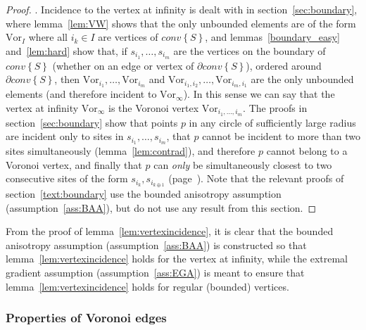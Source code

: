 \documentclass[11pt]{article}
\newcommand{\Sites}{S}
\newcommand{\Vor}{\text{Vor}}
\newcommand{\CHS}{{conv}\left\{\Sites\right\}}
\begin{document}
\begin{proof}
\vspace*{0.1in}\noindent{\bf [Vertex at infinity, $\Vor_\infty$]}. 
Incidence to the vertex at infinity is dealt with in section~\ref{sec:boundary}, 
	where lemma~\ref{lem:VW} shows that the only unbounded elements 
	are of the form $\Vor_I$ where all $i_k\in I$ are vertices of $\CHS$, 
and lemmas~\ref{boundary_easy} and~\ref{lem:hard} show that, 
	if $s_{i_1},\dots,s_{i_m}$ are the vertices on the boundary of $\CHS$ (whether on an edge or vertex of $\partial\CHS$), 
	ordered around $\partial\CHS$, 
	then $\Vor_{i_1},\dots,\Vor_{i_m}$ and $\Vor_{i_1,i_2},\dots,\Vor_{i_m,i_1}$ are the only unbounded elements
	(and therefore incident to $\Vor_\infty$). 
In this sense we can say that the vertex at infinity $\Vor_\infty$ is the Voronoi vertex $\Vor_{i_1,\dots,i_m}$. 
The proofs in section~\ref{sec:boundary} show that points $p$ in any circle of sufficiently large radius are incident 
	only to sites in $s_{i_1},\dots,s_{i_m}$, 
	that $p$ cannot be incident to more than two sites simultaneously (lemma~\ref{lem:contrad}), 
	and therefore $p$ cannot belong to a Voronoi vertex, 
	and finally that $p$ can \emph{only} be simultaneously closest to two consecutive sites of the form $s_{i_k},s_{i_{k\oplus 1}}$
	(page~\pageref{text:boundary}). 
Note that the relevant proofs of section~\ref{text:boundary} use the bounded anisotropy assumption (assumption~\ref{ass:BAA}), 
	but do not use any result from this section. 
\end{proof}

From the proof of lemma~\ref{lem:vertexincidence}, 
	it is clear that 
	the bounded anisotropy assumption (assumption~\ref{ass:BAA}) 
	is constructed so that lemma~\ref{lem:vertexincidence} holds for the vertex at infinity, 
	while the extremal gradient assumption (assumption~\ref{ass:EGA}) 
	is meant to ensure that  lemma~\ref{lem:vertexincidence} holds for regular (bounded) vertices.




\subsubsection{Properties of Voronoi edges}\label{sec:propedges}
\end{document}
